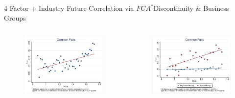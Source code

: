 \documentclass{beamer}
\begin{document}
\begin{frame}{ 4 Factor + Industry Future  Correlation via $ FCA^* $}{Discontinuity \&  Business Groups}
		\begin{columns}
			\begin{figure}   
				\centering
				\includegraphics[width=\linewidth]{"Output/Qmcorr5subsample.eps"}     \end{figure}            
			\begin{figure}
				\centering  
				\includegraphics[width=\linewidth]{"Output/Qmcorr5lrdbgsubsample.eps"}
			\end{figure}
		\end{columns}
		\centering
		
		
		
	\end{frame}
		
\end{document}

